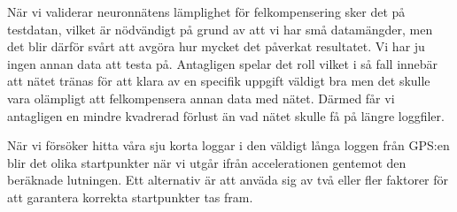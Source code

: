 {När vi validerar neuronnätens lämplighet för felkompensering sker det på testdatan,
vilket är nödvändigt på grund av att vi har små datamängder, men det blir därför
svårt att avgöra hur mycket det påverkat resultatet.
Vi har ju ingen annan data att testa på.
Antagligen spelar det roll vilket i så fall innebär att nätet tränas för att
klara av en specifik uppgift väldigt bra men det skulle vara olämpligt att
felkompensera annan data med nätet.
Därmed får vi antagligen en mindre kvadrerad förlust än vad nätet skulle få på
längre loggfiler.

När vi försöker hitta våra sju korta loggar i den väldigt långa loggen från
GPS:en blir det olika startpunkter när vi utgår ifrån accelerationen
gentemot den beräknade lutningen.
Ett alternativ är att anväda sig av två eller fler faktorer för
att garantera korrekta startpunkter tas fram.
}
